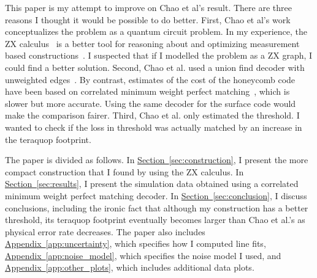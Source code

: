 \documentclass[onecolumn,unpublished,a4paper]{quantumarticle}
\theoremstyle{definition}
\theoremstyle{definition}
\theoremstyle{definition}
\renewcommand{\sec}[1]{\hyperref[sec:#1]{Section~\ref*{sec:#1}}}
\DeclareRobustCommand{\app}[1]{\hyperref[app:#1]{Appendix~\ref*{app:#1}}}
\begin{document}
This paper is my attempt to improve on Chao et al's result.
There are three reasons I thought it would be possible to do better.
First, Chao et al's work conceptualizes the problem as a quantum circuit problem.
In my experience, the ZX calculus~\cite{coecke2011introducezx} is a better tool for reasoning about and optimizing measurement based constructions~\cite{de2017zxlattice}.
I suspected that if I modelled the problem as a ZX graph, I could find a better solution.
Second, Chao et al. used a union find decoder with unweighted edges~\cite{delfosse2021almost}.
By contrast, estimates of the cost of the honeycomb code have been based on correlated minimum weight perfect matching~\cite{gidney2021honeycombmemory,gidney2022planarhoneycomb}, which is slower but more accurate.
Using the same decoder for the surface code would make the comparison fairer.
Third, Chao et al. only estimated the threshold.
I wanted to check if the loss in threshold was actually matched by an increase in the teraquop footprint.

The paper is divided as follows.
In \sec{construction}, I present the more compact construction that I found by using the ZX calculus.
In \sec{results}, I present the simulation data obtained using a correlated minimum weight perfect matching decoder.
In \sec{conclusion}, I discuss conclusions, including the ironic fact that although  my construction has a better threshold, its teraquop footprint eventually becomes larger than Chao et al.'s as physical error rate decreases.
The paper also includes \app{uncertainty}, which specifies how I computed line fits, \app{noise_model}, which specifies the noise model I used, and \app{other_plots}, which includes additional data plots.
\end{document}
